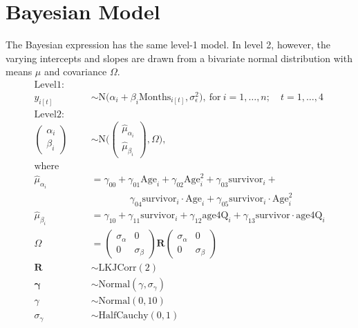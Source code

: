 \documentclass{article}
\begin{document}
\section{Bayesian Model}

The Bayesian expression has the same level-1 model.  In
level 2, however, the varying intercepts and slopes are
drawn from a bivariate normal distribution with means
$\mu$ and covariance $\Omega$.  
\begin{equation}
\begin{aligned}
\mathrm{Level 1:} \phantom{2cm} & \\
        y_{i[t]} &\sim \mathrm{N}\bigl(\alpha_{i} + 
        \beta_{i} \mathrm{Months}_{i[t]}, \sigma^2_{\epsilon}\bigr),\ 
    \mathrm{for}\ i = 1, \dots, n;\quad  t = 1, \dots, 4  \\
\mathrm{Level 2:} \phantom{2cm} & \\
    \begin{pmatrix}
    \alpha_{i}\\
    \beta_{i}
    \end{pmatrix} &\sim \mathrm{N} \Biggl(
      \begin{pmatrix}
       \hat\mu_{\alpha_i}\\
       \hat\mu_{\beta_i}
      \end{pmatrix}\! \!,
      \Omega  
      \Biggr), \\
    \mathrm{where}& \\
        \hat\mu_{\alpha_i} &=
        \gamma_{00} +
        \gamma_{01} \mathrm{Age}_i + 
        \gamma_{02} \mathrm{Age}^2_i + 
        \gamma_{03} \mathrm{survivor}_i + \\
        & \qquad \qquad 
        \gamma_{04} \mathrm{survivor}_i\cdot \mathrm{Age}_i+ 
        \gamma_{05} \mathrm{survivor}_i\cdot \mathrm{Age}^2_i 
        \\
        \hat\mu_{\beta_i} &= 
        \gamma_{10} + \gamma_{11} \mathrm{survivor}_i + 
        \gamma_{12} \mathrm{age4Q}_i + %
        \gamma_{13} \mathrm{survivor}\cdot \mathrm{age4Q}_i \\
        \Omega &= \begin{pmatrix}
               \sigma_\alpha & 0           \\
               0             & \sigma_\beta
               \end{pmatrix} 
               \boldsymbol{R} 
               \begin{pmatrix}
               \sigma_\alpha & 0           \\
               0             & \sigma_\beta
               \end{pmatrix}  \\
        \boldsymbol{R} &\sim \mathrm{LKJCorr}(2) \\
        \boldsymbol{\gamma} &\sim\mathrm{Normal}(\gamma, \sigma_{\gamma})\\
        \gamma &\sim \mathrm{Normal}(0, 10) \\
        \sigma_{\gamma} &\sim \mathrm{HalfCauchy}(0, 1)
  \label{EQ:BAYES} 
\end{aligned}
\end{equation}
\end{document}
